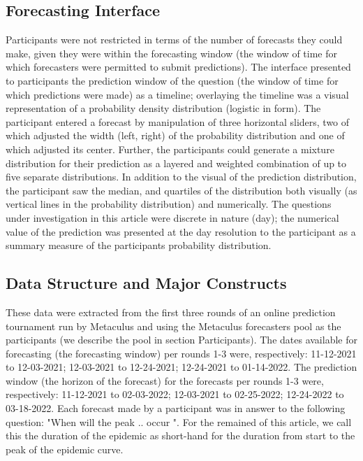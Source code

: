 \documentclass[a4paper,man,natbib]{apa6}
\begin{document}
\subsection{Forecasting Interface}\label{interface}
Participants were not restricted in terms of the number of forecasts they could make, given they were within the forecasting window (the window of time for which forecasters were permitted to submit predictions).  The interface presented to participants the prediction window of the question (the window of time for which predictions were made) as a timeline; overlaying the timeline was a visual representation of a probability density distribution (logistic in form).  The participant entered a forecast by manipulation of three horizontal sliders, two of which adjusted the width (left, right) of the probability distribution and one of which adjusted its center.  Further, the participants could generate a mixture distribution for their prediction as a layered and weighted combination of up to five separate distributions.  
In addition to the visual of the prediction distribution, the participant saw the median, and quartiles of the distribution both visually (as vertical lines in the probability distribution) and numerically.  The questions under investigation in this article were discrete in nature (day); the numerical value of the prediction was presented at the day resolution to the participant as a summary measure of the participants probability distribution.  

\subsection{Data Structure and Major Constructs}\label{data-structure}
These data were extracted from the first three rounds of an online prediction tournament run by Metaculus and using the Metaculus forecasters pool as the participants (we describe the pool in section Participants).  The dates available for forecasting (the forecasting window) per rounds 1-3 were, respectively: 11-12-2021 to 12-03-2021; 12-03-2021 to 12-24-2021; 12-24-2021 to 01-14-2022.  The prediction window (the horizon of the forecast) for the forecasts per rounds 1-3 were, respectively: 11-12-2021 to 02-03-2022; 12-03-2021 to 02-25-2022; 12-24-2022 to 03-18-2022.  Each forecast made by a participant was in answer to the following question:  "When will the peak .. occur ". For the remained of this article, we call this the duration of the epidemic as short-hand for the duration from start to the peak of the epidemic curve. 
\end{document}
